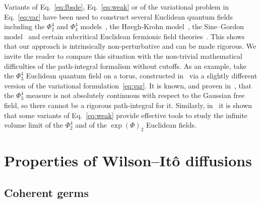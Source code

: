 \documentclass[reprint,aps]{revtex4-2}
\begin{document}
Variants of Eq.~\eqref{eq:fbsde}, Eq.~\eqref{eq:weak} or of the variational
problem in Eq.~\eqref{eq:var} have been used to construct several Euclidean
quantum fields including the $\Phi^4_2$ and $\Phi^4_3$
models~{\cite{barashkov2021variational,barashkov2020variational,barashkov2021phi43}},
the H{\o}egh-Krohn model~{\cite{barashkov2021variational}}, the Sine--Gordon
model~{\cite{barashkovStochasticControlApproach2022}} and certain subcritical
Euclidean fermionic field theories~{\cite{de_vecchi22}}. This shows that our
approach is intrinsically non-perturbative and can be made rigorous. We invite
the reader to compare this situation with the non-trivial mathematical
difficulties of the path-integral formalism without cutoffs. As an example,
take the $\Phi^4_3$ Euclidean quantum field on a torus, constructed
in~{\cite{barashkov2020variational}} via a slightly different version of the
variational formulation~\eqref{eq:var}. It is known, and proven
in~{\cite{barashkov2021phi43}}, that the $\Phi^4_3$ measure is not absolutely
continuous with respect to the Gaussian free field, so there cannot be a
rigorous path-integral for it. Similarly, in~{\cite{barashkov2021variational}}
it is shown that some variants of Eq.~\eqref{eq:weak} provide effective tools
to study the infinite volume limit of the $\Phi^4_2$ and of the $\exp
(\Phi)_2$ Euclidean fields.

\section{Properties of Wilson--It{\^o} diffusions}\label{SectionConstruction}

\subsection{Coherent germs}\label{SectionCoherence}
\end{document}
